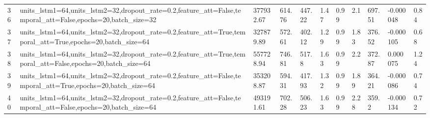 \begin{longtable}{C{0.8cm} L{2cm} C{1.15cm} C{1.15cm} C{1.15cm} C{1.15cm} C{0.85cm} C{1.25cm} C{1.2cm} C{1.5cm} C{1.0cm}}
36 & units\_lstm1=64,\newline units\_lstm2=32,\newline dropout\_rate=0.2,\newline feature\_att=False,\newline temporal\_att=False,\newline epochs=20,\newline batch\_size=32 & 377932.67 & 614.76 & 447.22 & 1.47 & 0.99 & 2.1 & 697.51 & -0.000048 & 0.84 \\
37 & units\_lstm1=64,\newline units\_lstm2=32,\newline dropout\_rate=0.2,\newline feature\_att=True,\newline temporal\_att=True,\newline epochs=20,\newline batch\_size=64 & 327879.89 & 572.61 & 402.12 & 1.29 & 0.99 & 1.83 & 376.52 & -0.000105 & 0.68 \\
38 & units\_lstm1=64,\newline units\_lstm2=32,\newline dropout\_rate=0.2,\newline feature\_att=True,\newline temporal\_att=False,\newline epochs=20,\newline batch\_size=64 & 557728.94 & 746.81 & 517.8 & 1.63 & 0.99 & 2.2 & 372.87 & 0.000075 & 1.24 \\
39 & units\_lstm1=64,\newline units\_lstm2=32,\newline dropout\_rate=0.2,\newline feature\_att=False,\newline temporal\_att=True,\newline epochs=20,\newline batch\_size=64 & 353208.87 & 594.31 & 417.93 & 1.32 & 0.99 & 1.89 & 364.21 & -0.000086 & 0.74 \\
40 & units\_lstm1=64,\newline units\_lstm2=32,\newline dropout\_rate=0.2,\newline feature\_att=False,\newline temporal\_att=False,\newline epochs=20,\newline batch\_size=64 & 493191.61 & 702.28 & 506.23 & 1.63 & 0.99 & 2.28 & 359.2 & -0.000134 & 0.72 \\

\end{longtable}
